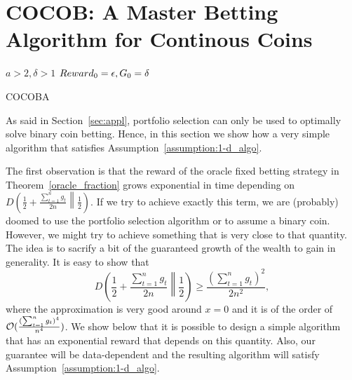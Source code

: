 \section{COCOB: A Master Betting Algorithm for Continous Coins}
\label{sec:algo}

\begin{algorithm}[ht]
  \begin{algorithmic}
  {
     $a>2,\delta>1$
     $Reward_0=\epsilon,G_0=\delta$
    \ENDFOR
  }
  \end{algorithmic}
  \caption{COCOBA}
  \label{alg:cocob}
\end{algorithm}

As said in Section~\ref{sec:appl}, portfolio selection can only be used to optimally solve binary coin betting.
Hence, in this section we show how a very simple algorithm that satisfies Assumption~\ref{assumption:1-d_algo}.

The first observation is that the reward of the oracle fixed betting strategy in Theorem~\ref{oracle_fraction} grows exponential in time depending on $D\left(\frac{1}{2}+\frac{\sum_{t=1}^n g_t}{2 n}\middle\|\frac{1}{2}\right)$. If we try to achieve exactly this term, we are (probably) doomed to use the portfolio selection algorithm or to assume a binary coin.
However, we might try to achieve something that is very close to that quantity.
The idea is to sacrify a bit of the guaranteed growth of the wealth to gain in generality.
It is easy to show that
\[
D\left(\frac{1}{2}+\frac{\sum_{t=1}^n g_t}{2 n}\middle\|\frac{1}{2}\right) \geq \frac{(\sum_{t=1}^n g_t)^2}{2 n^2},
\]
where the approximation is very good around $x=0$ and it is of the order of $\mathcal{O}(\frac{(\sum_{t=1}^n g_t)^4}{ n^4})$. 
We show below that it is possible to design a simple algorithm that has an exponential reward that depends on this quantity. Also, our guarantee will be data-dependent and the resulting algorithm will satisfy Assumption~\ref{assumption:1-d_algo}.

